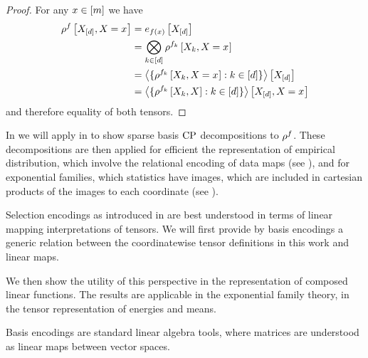 \begin{proof}
    For any $x\in[m]$ we have
    \begin{align*}
        \rho^{f}\left[X_{[d]},X_{}=x_{}\right]
        &= e_{f(x)}\left[X_{[d]}\right] \\
        &= \bigotimes_{k\in[d]} \rho^{f_{k}}\left[X_{k},X_{}=x_{}\right] \\
        &= \left\langle 
            \{\rho^{f_{k}}\left[X_{k},X_{}=x_{}\right] : k\in[d]\}
        \right\rangle \left[ X_{[d]} \right] \\
        &= \left\langle 
            \{\rho^{f_{k}}\left[X_{k},X\right] : k\in[d]\}
        \right\rangle \left[ X_{[d]},X_{}=x_{} \right]
    \end{align*}
    and therefore equality of both tensors.
\end{proof}

In  we will apply  in  to show sparse basis $\mathrm{CP}$ decompositions to $\rho^{f}$.
These decompositions are then applied for efficient the representation of empirical distribution, which involve the relational encoding of data maps (see ), and for exponential families, which statistics have images, which are included in cartesian products of the images to each coordinate (see ).




Selection encodings as introduced in  are best understood in terms of linear mapping interpretations of tensors.
We will first provide by basis encodings a generic relation between the coordinatewise tensor definitions in this work and linear maps.

We then show the utility of this perspective in the representation of composed linear functions.
The results are applicable in the exponential family theory, in the tensor representation of energies and means.


Basis encodings are standard linear algebra tools, where matrices are understood as linear maps between vector spaces.

